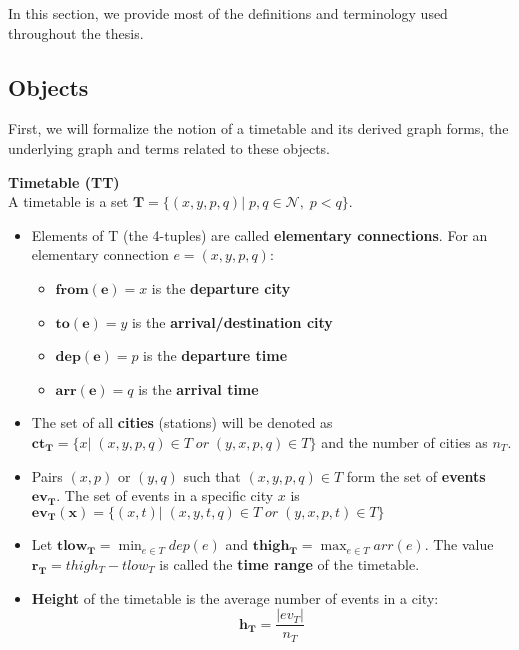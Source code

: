In this section, we provide most of the definitions and terminology used throughout the thesis. 

	\subsection{Objects}

	First, we will formalize the notion of a timetable and its derived graph forms, the underlying graph and terms related to these objects.
	
	\begin{definition}
        \textbf{Timetable (TT)} \\
        A timetable is a set $\bm{T} = \{(x, y, p, q)| \; p, q \in \mathcal{N}, \; p < q \}$.
        \begin{itemize}
        	\item Elements of T (the 4-tuples) are called \textbf{elementary connections}. For an elementary connection $e = (x, y, p, q)$:
        	\begin{itemize}
        		\item $\bm{from(e)} = x$ is the \textbf{departure city}
        		\item $\bm{to(e)} = y$ is the \textbf{arrival/destination city}
        		\item $\bm{dep(e)} = p$ is the \textbf{departure time}
        		\item $\bm{arr(e)} = q$ is the \textbf{arrival time}
        	\end{itemize}
        	\item The set of all \textbf{cities} (stations) will be denoted as $\bm{ct_{T}} = \{x| \; (x, y, p, q) \in T \; or \; (y, x, p, q) \in T\}$ and the number of cities as $n_{T}$. 
        	\item Pairs $(x, p)$ or $(y, q)$ such that $(x, y, p, q) \in T$ form the set of \textbf{events} $\bm{ev_{T}}$. The set of events in a specific city $x$ is $\bm{ev_{T}(x)} = \{(x, t)| \; (x, y, t, q) \in T \; or \; (y, x, p, t) \in T\}$
        	\item Let $\bm{tlow_{T}} = \min_{e \in T} dep(e)$ and $\bm{thigh_{T}} = \max_{e \in T} arr(e)$. The value $\bm{r_{T}} = thigh_{T} - tlow_{T}$ is called the \textbf{time range} of the timetable.
        	\item \textbf{Height} of the timetable is the average number of events in a city: 
        	$$\bm{h_{T}} = \frac{|ev_{T}|}{n_{T}}$$
        \end{itemize}
    \end{definition}
    
